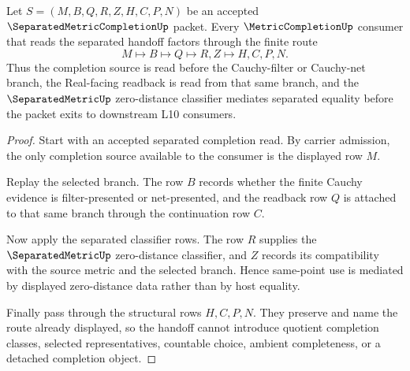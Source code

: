 \begin{theorem}
\label{thm:separated-metric-completion-metriccompletion-handoff}
Let $S=(M,B,Q,R,Z,H,C,P,N)$ be an accepted $\SeparatedMetricCompletionUp$ packet. Every $\MetricCompletionUp$ consumer that reads the separated handoff factors through the finite route
$$
M \longmapsto B \longmapsto Q \longmapsto R,Z \longmapsto H,C,P,N .
$$
Thus the completion source is read before the Cauchy-filter or Cauchy-net branch, the Real-facing readback is read from that same branch, and the $\SeparatedMetricUp$ zero-distance classifier mediates separated equality before the packet exits to downstream L10 consumers.
\end{theorem}
\begin{proof}
Start with an accepted separated completion read. By carrier admission, the only completion source available to the consumer is the displayed row $M$.

Replay the selected branch. The row $B$ records whether the finite Cauchy evidence is filter-presented or net-presented, and the readback row $Q$ is attached to that same branch through the continuation row $C$.

Now apply the separated classifier rows. The row $R$ supplies the $\SeparatedMetricUp$ zero-distance classifier, and $Z$ records its compatibility with the source metric and the selected branch. Hence same-point use is mediated by displayed zero-distance data rather than by host equality.

Finally pass through the structural rows $H,C,P,N$. They preserve and name the route already displayed, so the handoff cannot introduce quotient completion classes, selected representatives, countable choice, ambient completeness, or a detached completion object.
\end{proof}

\begin{closurestatus}{\SeparatedMetricCompletionUp}
  \theoryclosure{\seedClosure}
  \formalstatus{\unformalizedV}
\end{closurestatus}
